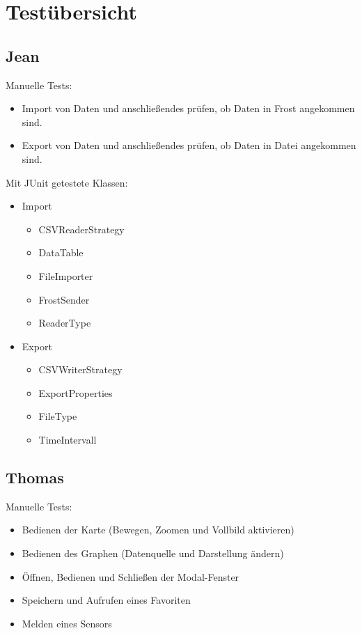 \chapter{Testübersicht}

\section{Jean}
Manuelle Tests:
\begin{itemize}
	\item Import von Daten und anschließendes prüfen, ob Daten in Frost angekommen sind.
	\item Export von Daten und anschließendes prüfen, ob Daten in Datei angekommen sind.
\end{itemize}
Mit JUnit getestete Klassen:
\begin{itemize}
	\item Import
	\begin{itemize}
		\item CSVReaderStrategy
		\item DataTable
		\item FileImporter
		\item FrostSender
		\item ReaderType
	\end{itemize}
	\item Export
	\begin{itemize}
		\item CSVWriterStrategy
		\item ExportProperties
		\item FileType
		\item TimeIntervall
	\end{itemize}
\end{itemize}

\section{Thomas}
Manuelle Tests:
\begin{itemize}
	\item Bedienen der Karte (Bewegen, Zoomen und Vollbild aktivieren)
	\item Bedienen des Graphen (Datenquelle und Darstellung ändern)
	\item Öffnen, Bedienen und Schließen der Modal-Fenster
	\item Speichern und Aufrufen eines Favoriten
	\item Melden eines Sensors
\end{itemize}

